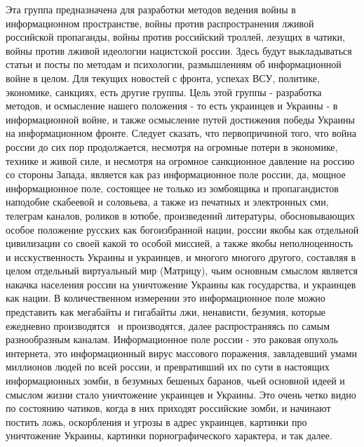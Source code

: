  
 
 
 
 

Эта группа предназначена для разработки методов ведения войны в информационном
пространстве, войны против распространения лживой российской пропаганды, войны
против российский троллей, лезущих в чатики, войны против лживой идеологии
нацистской россии. Здесь будут выкладываться статьи и посты по методам и
психологии, размышлениям об информационной войне в целом. Для текущих новостей
с фронта, успехах ВСУ, политике, экономике, санкциях, есть другие группы. Цель
этой группы - разработка методов, и осмысление нашего положения - то есть
украинцев и Украины - в информационной войне, и также осмысление путей
достижения победы Украины на информационном фронте. Следует сказать, что
первопричиной того, что война россии до сих пор продолжается, несмотря на
огромные потери в экономике, технике и живой силе, и несмотря на огромное
санкционное давление на россию со стороны Запада, является как раз
информационное поле россии, да, мощное информационное поле, состоящее не только
из зомбоящика и пропагандистов наподобие скабеевой и соловьева, а также из
печатных и электронных сми, телеграм каналов, роликов в ютюбе, произведений
литературы, обосновывающих особое положение русских как богоизбранной нации,
россии якобы как отдельной цивилизации со своей какой то особой миссией, а
также якобы неполноценность и исскуственность Украины и украинцев, и многого
многого другого, составляя в целом отдельный виртуальный мир (Матрицу), чьим
основным смыслом является накачка населения россии на уничтожение Украины как
государства, и украинцев как нации. В количественном измерении это
информационное поле можно представить как мегабайты и гигабайты лжи, ненависти,
безумия, которые ежедневно производятся  и производятся, далее распространяясь
по самым разнообразным каналам. Информационное поле россии - это раковая
опухоль интернета, это информационный вирус массового поражения, завладевший
умами миллионов людей по всей россии, и превративший их по сути в настоящих
информационных зомби, в безумных бешеных баранов, чьей основной идеей и смыслом
жизни стало уничтожение украинцев и Украины. Это очень четко видно по состоянию
чатиков, когда в них приходят российские зомби, и начинают постить ложь,
оскорбления и угрозы в адрес украинцев, картинки про уничтожение Украины,
картинки порнографического характера, и так далее.

